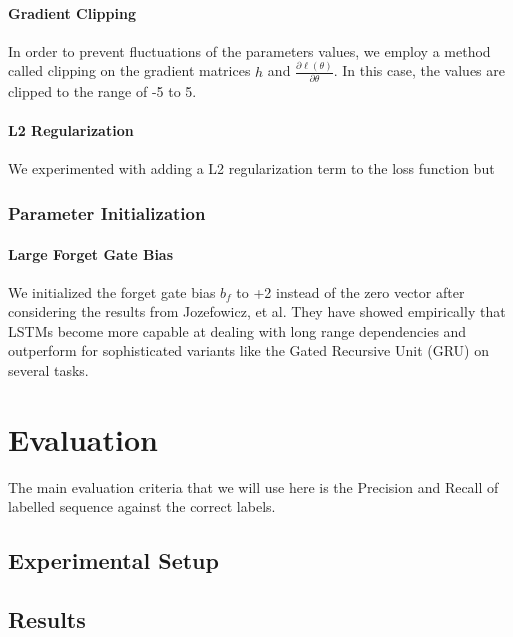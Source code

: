 \documentclass[fyp]{socreport}
\begin{document}
\subsubsection{Gradient Clipping} In order to prevent fluctuations of the parameters
values, we employ a method called clipping on the gradient matrices $h$ and
$\frac{\partial \ell(\theta)}{\partial \theta}$. In this case, the values are
clipped to the range of -5 to 5.

\subsubsection{L2 Regularization} We experimented with adding a L2
regularization term to the loss function but


\subsection{Parameter Initialization}

\subsubsection{Large Forget Gate Bias} We initialized the forget gate bias
$b_f$ to +2 instead of the zero vector after considering the results from
Jozefowicz, et al\cite{ICML2015JozefowiczZS}. They have showed empirically that
LSTMs become more capable at dealing with long range dependencies and outperform
for sophisticated variants like the Gated Recursive Unit (GRU) on several
tasks.


\chapter{Evaluation}
The main evaluation criteria that we will use here is the Precision and Recall
of labelled sequence against the correct labels.


\section{Experimental Setup}

\section{Results}
\end{document}
